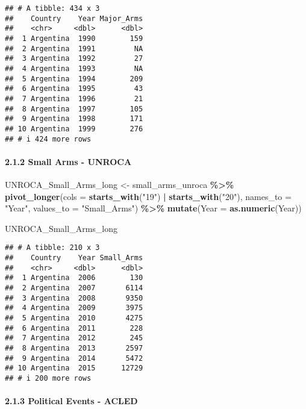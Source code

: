 \documentclass[
  11pt,
]{article}
\newenvironment{Shaded}{\begin{snugshade}}{\end{snugshade}}
\newcommand{\AttributeTok}[1]{\textcolor[rgb]{0.13,0.29,0.53}{#1}}
\newcommand{\FunctionTok}[1]{\textcolor[rgb]{0.13,0.29,0.53}{\textbf{#1}}}
\newcommand{\NormalTok}[1]{#1}
\newcommand{\OtherTok}[1]{\textcolor[rgb]{0.56,0.35,0.01}{#1}}
\newcommand{\SpecialCharTok}[1]{\textcolor[rgb]{0.81,0.36,0.00}{\textbf{#1}}}
\newcommand{\StringTok}[1]{\textcolor[rgb]{0.31,0.60,0.02}{#1}}
\begin{document}
\begin{verbatim}
## # A tibble: 434 x 3
##    Country    Year Major_Arms
##    <chr>     <dbl>      <dbl>
##  1 Argentina  1990        159
##  2 Argentina  1991         NA
##  3 Argentina  1992         27
##  4 Argentina  1993         NA
##  5 Argentina  1994        209
##  6 Argentina  1995         43
##  7 Argentina  1996         21
##  8 Argentina  1997        105
##  9 Argentina  1998        171
## 10 Argentina  1999        276
## # i 424 more rows
\end{verbatim}

\paragraph{2.1.2 Small Arms - UNROCA}\label{small-arms---unroca-1}

\begin{Shaded}
\begin{Highlighting}[]
\NormalTok{UNROCA\_Small\_Arms\_long }\OtherTok{\textless{}{-}}\NormalTok{ small\_arms\_unroca }\SpecialCharTok{\%\textgreater{}\%}
  \FunctionTok{pivot\_longer}\NormalTok{(}\AttributeTok{cols =} \FunctionTok{starts\_with}\NormalTok{(}\StringTok{"19"}\NormalTok{) }\SpecialCharTok{|} \FunctionTok{starts\_with}\NormalTok{(}\StringTok{"20"}\NormalTok{), }
               \AttributeTok{names\_to =} \StringTok{"Year"}\NormalTok{, }\AttributeTok{values\_to =} \StringTok{"Small\_Arms"}\NormalTok{) }\SpecialCharTok{\%\textgreater{}\%}
  \FunctionTok{mutate}\NormalTok{(}\AttributeTok{Year =} \FunctionTok{as.numeric}\NormalTok{(Year))}

\NormalTok{UNROCA\_Small\_Arms\_long}
\end{Highlighting}
\end{Shaded}

\begin{verbatim}
## # A tibble: 210 x 3
##    Country    Year Small_Arms
##    <chr>     <dbl>      <dbl>
##  1 Argentina  2006        130
##  2 Argentina  2007       6114
##  3 Argentina  2008       9350
##  4 Argentina  2009       3975
##  5 Argentina  2010       4275
##  6 Argentina  2011        228
##  7 Argentina  2012        245
##  8 Argentina  2013       2597
##  9 Argentina  2014       5472
## 10 Argentina  2015      12729
## # i 200 more rows
\end{verbatim}

\paragraph{2.1.3 Political Events -
ACLED}\label{political-events---acled-1}
\end{document}
